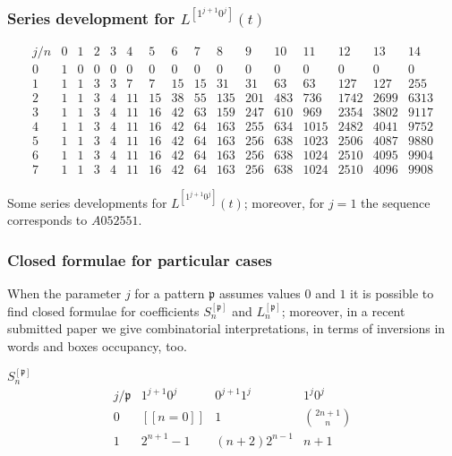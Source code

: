 \documentclass{beamer}
\begin{document}
\begin{frame}\frametitle{Series development for $L^{[1^{j+1}0^{j}]}(t)$}
{\tiny
\begin{table}
\begin{equation*}\begin{array}{c|ccccccccccccccc}j/n & 0 & 1 & 2 & 3 & 4 & 5 & 6 & 7 & 8 & 9 & 10 & 11 & 12 & 13 & 14\\\hline0 & 1 & 0 & 0 & 0 & 0 & 0 & 0 & 0 & 0 & 0 & 0 & 0 & 0 & 0 & 0\\1 & 1 & 1 & 3 & 3 & 7 & 7 & 15 & 15 & 31 & 31 & 63 & 63 & 127 & 127 & 255\\2 & 1 & 1 & 3 & 4 & 11 & 15 & 38 & 55 & 135 & 201 & 483 & 736 & 1742 & 2699 & 6313\\3 & 1 & 1 & 3 & 4 & 11 & 16 & 42 & 63 & 159 & 247 & 610 & 969 & 2354 & 3802 & 9117\\4 & 1 & 1 & 3 & 4 & 11 & 16 & 42 & 64 & 163 & 255 & 634 & 1015 & 2482 & 4041 & 9752\\5 & 1 & 1 & 3 & 4 & 11 & 16 & 42 & 64 & 163 & 256 & 638 & 1023 & 2506 & 4087 & 9880\\6 & 1 & 1 & 3 & 4 & 11 & 16 & 42 & 64 & 163 & 256 & 638 & 1024 & 2510 & 4095 & 9904\\7 & 1 & 1 & 3 & 4 & 11 & 16 & 42 & 64 & 163 & 256 & 638 & 1024 & 2510 & 4096 & 9908\end{array}\end{equation*}
\caption{Some series developments for $L^{[1^{j+1}0^j]}(t)$; moreover, for
$j=1$ the sequence corresponds to $A052551$.}
\end{table}
}
\end{frame}

\begin{frame}\frametitle{Closed formulae for particular cases}

When the parameter $j$ for a pattern $\mathfrak{p}$ assumes values $0$ and $1$
it is possible to find closed formulae for coefficients
$S_{n}^{[\mathfrak{p}]}$ and $L_{n}^{[\mathfrak{p}]}$; moreover, in a recent
submitted paper we give combinatorial interpretations, in terms of inversions
in words and boxes occupancy, too.

\begin{block}{$S_{n}^{[\mathfrak{p}]}$}
\begin{displaymath}
\begin{array}{c|ccc}
j/\mathfrak{p} & {1^{j+1}0^{j}} & {0^{j+1}1^{j}} & {1^{j}0^{j}} \\
\hline
0 &  [\![n = 0]\!] &  1 & { {2n+1}\choose{n} } \\
1 &  2^{n+1} -1 &  (n+2)2^{n-1} & n+1 \\
\end{array}{}
\end{displaymath}
\end{block}
\end{frame}
\end{document}
